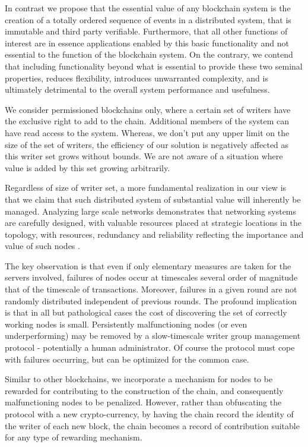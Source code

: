 \documentclass[10pt]{article}
\begin{document}
In contrast we propose that the essential value of any blockchain system is the creation of a totally ordered sequence of events in a distributed system, that is immutable and third party verifiable. Furthermore, that all other functions of interest are in essence applications enabled by this basic functionality and not essential to the function of the blockchain system. On the contrary, we contend that including functionality beyond what is essential to provide these two seminal properties, reduces flexibility, introduces unwarranted complexity, and is ultimately detrimental to the overall system performance and usefulness.


We consider permissioned blockchains only, where a certain set of writers have the exclusive right to add to the chain. Additional members of the system can have read access to the system. Whereas, we don't put any upper limit on the size of the set of writers, the efficiency of our solution is negatively affected as this writer set grows without bounds. We are not aware of a situation where value is added by this set growing arbitrarily. 

Regardless of size of writer set, a more fundamental realization in our view is that we claim that such distributed system of substantial value will inherently be managed. Analyzing large scale networks demonstrates that networking systems are carefully designed, with valuable resources placed at strategic locations in the topology, with resources, redundancy and reliability reflecting the importance and value of such nodes \cite{Maltz2004}. 

The key observation is that even if only elementary measures are taken for the servers involved, failures of nodes occur at timescales several order of magnitude that of the timescale of transactions. Moreover, failures in a given round are not randomly distributed independent of previous rounds. The profound implication is that in all but pathological cases the cost of discovering the set of correctly working nodes is small. Persistently malfunctioning nodes (or even underperforming) may be removed by a slow-timescale writer group management protocol - potentially a human administrator. Of course the protocol must cope with failures occurring, but can be optimized for the common case.

Similar to other blockchains, we incorporate a mechanism for nodes to be rewarded for contributing to the construction of the chain, and consequently malfunctioning nodes to be penalized. However, rather than obfuscating the protocol with a new crypto-currency, by having the chain record the identity of the writer of each new block, the chain becomes a record of contribution suitable for any type of rewarding mechanism.
\end{document}
